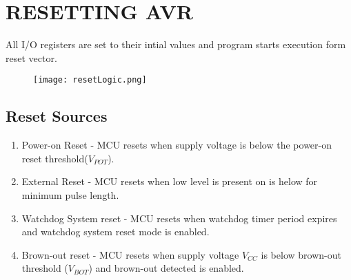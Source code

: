 \section{RESETTING AVR}
\quad All I/O registers are set to their intial values and program starts execution form reset vector.

\begin{figure}[H]
    \begin{center}
        \texttt{[image: resetLogic.png]}
    \end{center}
\end{figure}

\subsection{Reset Sources}
\begin{enumerate}[label=(\Roman*)]
    \item Power-on Reset - MCU resets when supply voltage is below the power-on reset threshold($V_{POT}$).
    \item External Reset - MCU resets when low level is present on  is helow for minimum pulse length.
    \item Watchdog System reset - MCU resets when watchdog timer period expires and watchdog system reset mode is enabled.
    \item Brown-out reset - MCU resets when supply voltage $V_{CC}$ is below brown-out threshold ($V_{BOT}$) and brown-out detected is enabled.
\end{enumerate}


